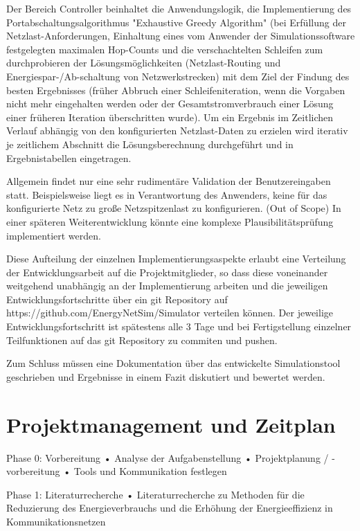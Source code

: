 \documentclass[12pt,titlepage]{article}
\begin{document}
Der Bereich Controller beinhaltet die Anwendungslogik, die Implementierung des Portabschaltungsalgorithmus "Exhaustive Greedy Algorithm" (bei Erfüllung der Netzlast-Anforderungen, Einhaltung eines vom Anwender der Simulationssoftware festgelegten maximalen Hop-Counts und die verschachtelten Schleifen zum durchprobieren der Lösungsmöglichkeiten (Netzlast-Routing und Energiespar-/Ab-schaltung von Netzwerkstrecken) mit dem Ziel der Findung des besten Ergebnisses (früher Abbruch einer Schleifeniteration, wenn die Vorgaben nicht mehr eingehalten werden oder der Gesamtstromverbrauch einer Lösung einer früheren Iteration überschritten wurde). Um ein Ergebnis im Zeitlichen Verlauf abhängig von den konfigurierten Netzlast-Daten zu erzielen wird iterativ je zeitlichem Abschnitt die Lösungsberechnung durchgeführt und in Ergebnistabellen eingetragen.
 
Allgemein findet nur eine sehr rudimentäre Validation der Benutzereingaben statt. Beispielsweise liegt es in Verantwortung des Anwenders, keine für das konfigurierte Netz zu große Netzspitzenlast zu konfigurieren. (Out of Scope) In einer späteren Weiterentwicklung könnte eine komplexe Plausibilitätsprüfung implementiert werden.
 
Diese Aufteilung der einzelnen Implementierungsaspekte erlaubt eine Verteilung der Entwicklungsarbeit auf die Projektmitglieder, so dass diese voneinander weitgehend unabhängig an der Implementierung arbeiten und die jeweiligen Entwicklungsfortschritte über ein git Repository auf https://github.com/EnergyNetSim/Simulator verteilen können. Der jeweilige Entwicklungsfortschritt ist spätestens alle 3 Tage und bei Fertigstellung einzelner Teilfunktionen auf das git Repository zu commiten und pushen.
 
Zum Schluss müssen eine Dokumentation über das entwickelte Simulationstool geschrieben und Ergebnisse in einem Fazit diskutiert und bewertet werden. 
 
 




\section{Projektmanagement und Zeitplan}


Phase 0: Vorbereitung
•	Analyse der Aufgabenstellung
•	Projektplanung / -vorbereitung
•	Tools und Kommunikation festlegen
 
Phase 1: Literaturrecherche
•	Literaturrecherche zu Methoden für die Reduzierung des Energieverbrauchs und die Erhöhung der Energieeffizienz in Kommunikationsnetzen
 
\end{document}
